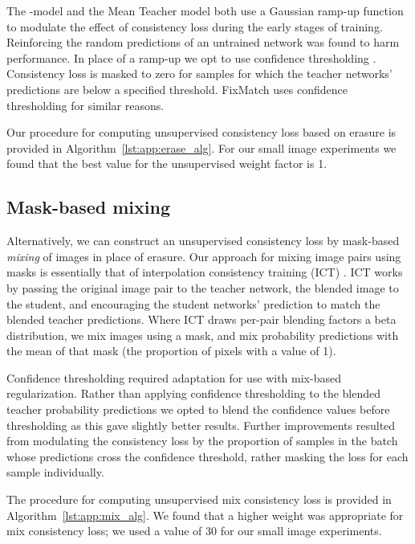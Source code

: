 \documentclass{article}
\begin{document}
The -model \cite{Laine:Temporal} and the Mean Teacher model \cite{Tarvainen:MeanTeachers} both use a Gaussian ramp-up function to modulate the effect of consistency loss during the early stages of training. Reinforcing the random predictions of an untrained network was found to harm performance. In place of a ramp-up we opt to use confidence thresholding \cite{French:SelfEnsDomAdapt}.
Consistency loss is masked to zero for samples for which the teacher networks' predictions are below a specified threshold. FixMatch \cite{Sohn:FixMatch} uses confidence thresholding for similar reasons.


Our procedure for computing unsupervised consistency loss based on erasure is provided in Algorithm~\ref{lst:app:erase_alg}. For our small image experiments we found that the best value for the unsupervised weight factor  is 1.







\subsection{Mask-based mixing}
Alternatively, we can construct an unsupervised consistency loss by mask-based \emph{mixing} of images in place of erasure.
Our approach for mixing image pairs using masks is essentially that of interpolation consistency training (ICT) \cite{Verma:ICT}.
ICT works by passing the original image pair to the teacher network, the blended image to the student, and encouraging the student networks' prediction to match the blended teacher predictions.
Where ICT draws per-pair blending factors a beta distribution, we mix images using a mask, and mix probability predictions with the mean of that mask (the proportion of pixels with a value of 1).


Confidence thresholding required adaptation for use with mix-based regularization.
Rather than applying confidence thresholding to the blended teacher probability
predictions we opted to blend the confidence values before thresholding as this gave
slightly better results. Further improvements resulted from modulating the consistency
loss by the proportion of samples in the batch whose predictions cross the confidence threshold,
rather masking the loss for each sample individually.




The procedure for computing unsupervised mix consistency loss is provided in Algorithm~\ref{lst:app:mix_alg}.
We found that a higher weight  was appropriate for mix consistency loss; we used
a value of 30 for our small image experiments.
\end{document}
